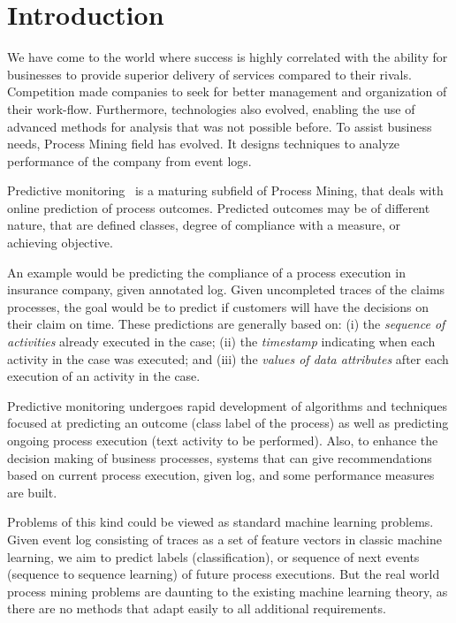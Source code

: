 

\section{Introduction} %
\label{sec:introduction}


We have come to the world where success is highly correlated with the ability for businesses to provide superior  delivery of services compared to their rivals. Competition made companies to seek for better management and organization of their work-flow. Furthermore, technologies also evolved, enabling the use of advanced methods for analysis that was not possible before. To assist business needs, Process Mining field has evolved. It designs techniques to analyze performance of the company from event logs.  

Predictive monitoring~\cite{Maggi:CAiSE2014} is a maturing subfield of Process Mining, that deals with online prediction of process outcomes. Predicted outcomes may be of different nature, that are defined classes, degree of compliance with a measure, or achieving objective.

An example would be predicting the compliance of a process execution in insurance company, given annotated log. Given uncompleted traces of the claims processes, the goal would be to predict if customers will have the decisions on their claim on time. These predictions are generally based on: (i) the \emph{sequence of activities} already executed in the case; (ii) the \emph{timestamp} indicating when each activity in the case was executed; and (iii) the \emph{values of data attributes} after each execution of an activity in the case.



Predictive monitoring undergoes rapid development of algorithms and techniques focused at predicting an outcome (class label of the process) as well as predicting ongoing process execution (text activity to be performed). Also, to enhance the decision making of business processes, systems that can give recommendations based on current process execution, given log, and some performance measures are built. 

Problems of this kind could be viewed as standard machine learning problems. Given event log consisting of traces as a set of feature vectors in classic machine learning, we aim to predict labels (classification), or sequence of next events (sequence to sequence learning) of future process executions. But the real world process mining problems are daunting to the existing machine learning theory, as there are no methods that adapt easily to all additional requirements. 

